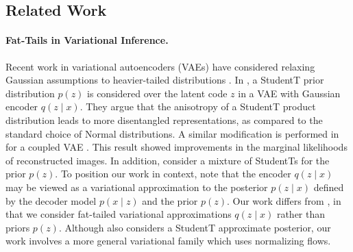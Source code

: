 \documentclass[thesis.tex]{subfiles}
\begin{document}
\subsection*{Related Work}
\vspace{-1mm}
\paragraph{Fat-Tails in Variational Inference.}

Recent work in variational autoencoders (VAEs) have considered relaxing Gaussian assumptions to heavier-tailed distributions \citep{mathieu2019disentangling,chen2019residual,boenninghoff2020variational,abiri2020variational}.
In \citet{mathieu2019disentangling}, a StudentT prior distribution $p(z)$ is considered over the latent code
$z$ in a VAE with Gaussian encoder $q(z \mid x)$. They argue
that the anisotropy of a StudentT product distribution leads to more disentangled representations, as compared to the standard choice of Normal distributions.
A similar modification is performed in \citet{chen2020use} for
a coupled VAE \citep{cao2019coupled}. 
This result showed improvements in the marginal
likelihoods of reconstructed images. In addition,
\citet{boenninghoff2020variational} consider a mixture of StudentTs for the
prior $p(z)$. To position
our work in context, note that the encoder $q(z \mid x)$ may be viewed
as a variational approximation to the posterior $p(z \mid x)$ defined by the
decoder model $p(x \mid z)$ and the prior $p(z)$. Our work differs from
\citet{mathieu2019disentangling,chen2020use,boenninghoff2020variational}, in
that we consider fat-tailed variational approximations $q(z \mid x)$ rather
than priors $p(z)$. Although \citet{abiri2020variational} also considers
a StudentT approximate posterior, our work involves a more general
variational family which uses normalizing flows.
\end{document}
